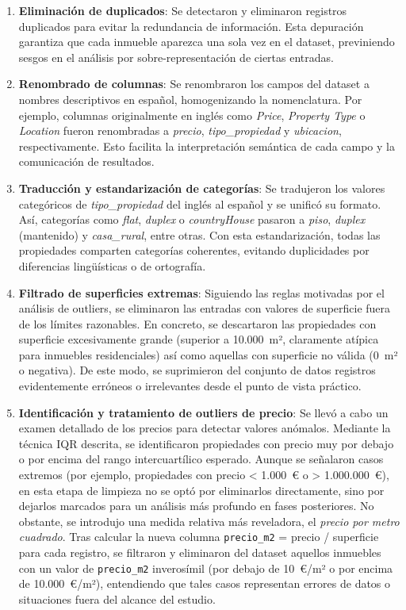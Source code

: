 \begin{enumerate}
\item \textbf{Eliminación de duplicados}: Se detectaron y eliminaron registros duplicados para evitar la redundancia de información. Esta depuración garantiza que cada inmueble aparezca una sola vez en el dataset, previniendo sesgos en el análisis por sobre-representación de ciertas entradas.

\item \textbf{Renombrado de columnas}: Se renombraron los campos del dataset a nombres descriptivos en español, homogenizando la nomenclatura. Por ejemplo, columnas originalmente en inglés como \emph{Price}, \emph{Property Type} o \emph{Location} fueron renombradas a \emph{precio}, \emph{tipo\_propiedad} y \emph{ubicacion}, respectivamente. Esto facilita la interpretación semántica de cada campo y la comunicación de resultados.

\item \textbf{Traducción y estandarización de categorías}: Se tradujeron los valores categóricos de \emph{tipo\_propiedad} del inglés al español y se unificó su formato. Así, categorías como \emph{flat}, \emph{duplex} o \emph{countryHouse} pasaron a \emph{piso}, \emph{duplex} (mantenido) y \emph{casa\_rural}, entre otras. Con esta estandarización, todas las propiedades comparten categorías coherentes, evitando duplicidades por diferencias lingüísticas o de ortografía.

\item \textbf{Filtrado de superficies extremas}: Siguiendo las reglas motivadas por el análisis de outliers, se eliminaron las entradas con valores de superficie fuera de los límites razonables. En concreto, se descartaron las propiedades con superficie excesivamente grande (superior a 10.000 m², claramente atípica para inmuebles residenciales) así como aquellas con superficie no válida (0 m² o negativa). De este modo, se suprimieron del conjunto de datos registros evidentemente erróneos o irrelevantes desde el punto de vista práctico.

\item \textbf{Identificación y tratamiento de outliers de precio}: Se llevó a cabo un examen detallado de los precios para detectar valores anómalos. Mediante la técnica IQR descrita, se identificaron propiedades con precio muy por debajo o por encima del rango intercuartílico esperado. Aunque se señalaron casos extremos (por ejemplo, propiedades con precio < 1.000 € o > 1.000.000 €), en esta etapa de limpieza no se optó por eliminarlos directamente, sino por dejarlos marcados para un análisis más profundo en fases posteriores. No obstante, se introdujo una medida relativa más reveladora, el \emph{precio por metro cuadrado}. Tras calcular la nueva columna \texttt{precio\_m2} = precio / superficie para cada registro, se filtraron y eliminaron del dataset aquellos inmuebles con un valor de \texttt{precio\_m2} inverosímil (por debajo de 10 €/m² o por encima de 10.000 €/m²), entendiendo que tales casos representan errores de datos o situaciones fuera del alcance del estudio.


\end{enumerate}
